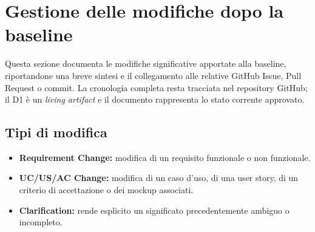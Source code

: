 \section{Gestione delle modifiche dopo la baseline}
\label{sec:modifiche}

Questa sezione documenta le modifiche significative apportate alla baseline, riportandone una breve sintesi e il collegamento alle relative GitHub Issue, Pull Request o commit. La cronologia completa resta tracciata nel repository GitHub; il D1 è un \emph{living artifact} e il documento rappresenta lo stato corrente approvato.

\subsection*{Tipi di modifica}
\begin{itemize}[leftmargin=1.4em, itemsep=0.15em]
    \item \textbf{Requirement Change:} modifica di un requisito funzionale o non funzionale.
    \item \textbf{UC/US/AC Change:} modifica di un caso d'uso, di una user story, di un criterio di accettazione o dei mockup associati.
    \item \textbf{Clarification:} rende esplicito un significato precedentemente ambiguo o incompleto.
\end{itemize}

